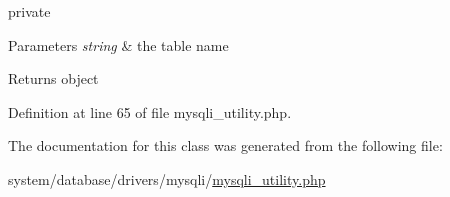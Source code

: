 private 
\begin{DoxyParams}{Parameters}
{\em string} & the table name \\
\hline
\end{DoxyParams}
\begin{DoxyReturn}{Returns}
object 
\end{DoxyReturn}


Definition at line 65 of file mysqli\-\_\-utility.\-php.



The documentation for this class was generated from the following file\-:\begin{DoxyCompactItemize}
\item 
system/database/drivers/mysqli/\hyperlink{mysqli__utility_8php}{mysqli\-\_\-utility.\-php}\end{DoxyCompactItemize}
